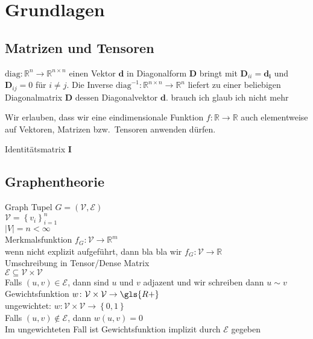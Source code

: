 \chapter{Grundlagen}

\section{Matrizen und Tensoren}

$\text{diag} \colon \mathbb{R}^n \to \mathbb{R}^{n \times n}$ einen Vektor $\mathbf{d}$ in Diagonalform $\mathbf{D}$ bringt mit $\mathbf{D}_{ii} = \mathbf{d_i}$ und $\mathbf{D}_{ij} = 0$ für $i \neq j$.
Die Inverse $\text{diag}^{-1} \colon \mathbb{R}^{n \times n} \to \mathbb{R}^n$ liefert zu einer beliebigen Diagonalmatrix $\mathbf{D}$ dessen Diagonalvektor $\mathbf{d}$.
brauch ich glaub ich nicht mehr

Wir erlauben, dass wir eine eindimensionale Funktion $f \colon \mathbb{R} \to \mathbb{R}$ auch elementweise auf Vektoren, Matrizen bzw.\ Tensoren anwenden dürfen.

Identitätsmatrix $\mathbf{I}$

\section{Graphentheorie}

Graph Tupel $G = \left(\mathcal{V}, \mathcal{E}\right)$\\
$\mathcal{V} = {\left\{ v_i \right\}}^n_{i=1}$\\
$\left| V \right| = n < \infty$\\
Merkmalsfunktion $f_G \colon \mathcal{V} \to \mathbb{R}^m$\\
wenn nicht explizit aufgeführt, dann bla bla wir $f_G \colon \mathcal{V} \to \mathbb{R}$\\
Umschreibung in Tensor/Dense Matrix\\
$\mathcal{E} \subseteq \mathcal{V} \times \mathcal{V}$\\
Falls $\left( u, v \right) \in \mathcal{E}$, dann sind $u$ und $v$ adjazent und wir schreiben dann $u \sim v$\\
Gewichtsfunktion $w \colon \mathcal{V} \times \mathcal{V} \to \gls{R+}$\\
ungewichtet: $w \colon \mathcal{V} \times \mathcal{V} \to \left\{ 0, 1 \right\}$\\
Falls $\left( u, v \right) \notin \mathcal{E}$, dann $w\left(u, v\right) = 0$\\
Im ungewichteten Fall ist Gewichtsfunktion implizit durch $\mathcal{E}$ gegeben\\

